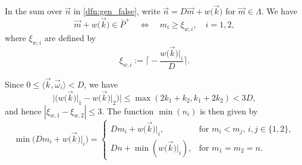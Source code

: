 \documentclass[10pt,a4paper]{amsart}
\theoremstyle{definition}
\numberwithin{equation}{section}
\begin{document}
In the sum over $\vec n$ in \eqref{dfn:gen_false}, write $\vec n=D\vec{m}+w\bigl(\vec{k}\bigr)$ for $\vec m\in \Lambda$. We have
\begin{equation*}
	\vec{m}+w\bigl(\vec{k}\bigr)\in \bar P^+ \quad \Leftrightarrow \quad m_i \geq \xi_{w,i}	, \quad i=1,2,
\end{equation*}
where $\xi_{w,i}$ are defined by
\begin{equation*}
	\xi_{w,i}:= \biggl\lceil - \frac{w\bigl(\vec{k}\bigr)\vert_i}{D} \biggr\rceil .
\end{equation*}

Since $0\leq \langle \vec k, \vec\omega_i\rangle < D$, we have
\begin{equation*}
	\big|\bigl(w\bigl(\vec{k}\bigr)\lvert_1-w\bigl(\vec{k}\bigr)\lvert_2\bigr)\big|\leq \max (2k_1+k_2, k_1+2k_2)< 3D,
\end{equation*} and hence $|\xi_{w,1}-\xi_{w,2}|\leq 3$.
The function $\min (n_i)$ is then given by
\begin{equation*}
	\min \bigl(Dm_i + w\bigl(\vec{k}\bigr)\vert_i\bigr) = \begin{cases}
		Dm_i + w\bigl(\vec{k}\bigr)\vert_i, & \text{for } m_i<m_{j}
		, \, i,j\in\{1,2\}, \\
		Dn + \min (w\bigl(\vec{k}\bigr)\vert_i), & \text{for } m_1=m_2=n
		.
	\end{cases}
\end{equation*}
\end{document}
